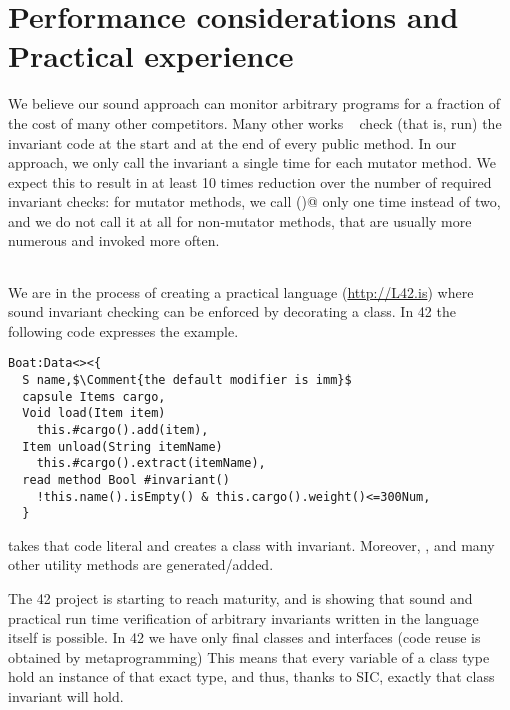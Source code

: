 \saveSpace
\section{Performance considerations and Practical experience}
\saveSpace
We believe our sound approach can monitor arbitrary programs
for a fraction of the cost of many other competitors.
Many other works%
~\cite{feldman2006jose,fahndrich2010embedded,abercrombie2002jcontractor,tran2003design}
 check (that is, run)
the invariant code at the start and at the end of every public
method.
In  our approach,
we only call the invariant a single time for each mutator method.
We expect this to result in at least 10 times reduction over
the number of required invariant checks:
for mutator methods, we call \Q@invariant()@ only one time instead of two,
and we
do not call it at all for non-mutator methods, that
 are usually more numerous and invoked more often.

${}_{}$

\noindent We are in the process of creating a practical language (\url{http://L42.is})
 where sound invariant checking can be enforced by decorating a class.
In 42 the following code expresses the \Q@Boat@ example.
\begin{lstlisting}
Boat:Data<><{
  S name,$\Comment{the default modifier is imm}$
  capsule Items cargo,
  Void load(Item item)
    this.#cargo().add(item),
  Item unload(String itemName)
    this.#cargo().extract(itemName),
  read method Bool #invariant()
    !this.name().isEmpty() & this.cargo().weight()<=300Num,
  }
\end{lstlisting}
\Q@Data@ takes that code literal and creates a \Q@Boat@ class with invariant.
Moreover, \Q@equals@, \Q@toString@ and many other utility methods are generated/added.

The 42 project is starting to reach maturity, and is showing that sound and practical
 run time verification of arbitrary invariants written in the language itself is possible. 
In 42 we have only final classes and interfaces (code reuse is obtained by metaprogramming)
This means that every variable of a class type hold an instance of that exact type, and 
thus, thanks to SIC, exactly that class invariant will hold.



\saveSpace
